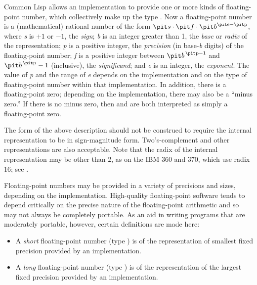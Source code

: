 {Common Lisp allows an implementation to provide one or more kinds of
floating-point number, which collectively make up the type .
Now a floating-point number is a (mathematical)
rational number of the form
${\it s} \cdot {\it f} \cdot {\it b}^{\hbox{\scriptsize\it e}-\hbox{\scriptsize\it p}}$,
where {\it s} is $+1$ or $-1$, the {\it sign};
{\it b} is an integer greater than 1,
the {\it base} or {\it radix} of the representation;
{\it p} is a positive integer,
the {\it precision} (in base-{\it b} digits) of the floating-point number;
{\it f} is a positive integer between
${\it b}^{\,\hbox{\scriptsize\it p}-1}$ and ${\it b}^{\,\hbox{\scriptsize\it p}}-1$ (inclusive),
the {\it significand};
and {\it e} is an integer, the {\it exponent}.
The value of {\it p} and the range of {\it e}
depends on the implementation and on the type of floating-point number
within that implementation.
In addition, there is a floating-point zero;
depending on the implementation, there may also be a ``minus zero.''
If there is no minus zero, then  and  are
both interpreted as simply a floating-point zero.

\beforenoterule
\begin{implementation}
The form of the above description should not be construed
to require the internal representation to be in sign-magnitude form.
Two's-complement and other representations are also acceptable.  Note
that the radix of the internal representation may be other than 2, as on
the IBM 360 and 370, which use radix 16; see
.
\end{implementation}
\afternoterule

Floating-point numbers may be provided in a variety of precisions and sizes,
depending on the implementation.  High-quality floating-point
software tends to depend critically on the precise nature of the
floating-point arithmetic and so may not always be completely portable.
As an aid in writing programs that are
moderately portable, however, certain definitions are made here:
\begin{itemize}
\item
A {\it short} floating-point number (type )
is of the representation of smallest
fixed precision provided by an implementation.

\item
A {\it long} floating-point number (type )
is of the representation of the largest fixed 
precision provided by an implementation.


\end{itemize}}
